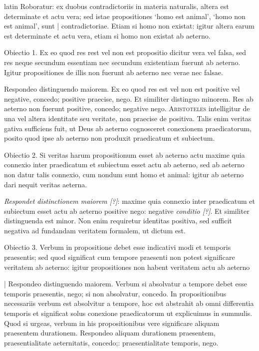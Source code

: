 \begin{otherlanguage*}{latin}
\pstart
  Roboratur: ex duobus contradictoriis in materia naturalis, altera est determinate et actu vera; sed istae propositiones `homo est animal', `homo non est animal', sunt \textnormal{|}   contradictoriae. Etiam si homo non existat: igitur altera earum est determinate et actu vera, etiam si homo non existat ab aeterno. 
\pend

\pstart
  Obiectio 1. Ex eo quod res rest vel non est propositio dicitur vera vel falsa, sed res neque secundum essentiam nec secundum existentiam fuerunt ab aeterno. Igitur propositiones de illis non fuerunt ab aeterno nec verae nec falsae. 
\pend

\pstart
  Respondeo distinguendo maiorem. Ex eo quod res est vel non est positive vel negative, concedo; positive praecise, nego. Et similiter distinguo minorem. Res ab aeterno non fuerunt positive, concedo; negative nego. \textsc{Aristoteles} intelligitur de una vel altera identitate seu veritate, non praecise de positiva. Talis enim veritas gativa sufficiens fuit, ut Deus ab aeterno cognosceret conexionem praedicatorum, posito quod ipse ab aeterno non produxit praedicatum et subiectum. 
\pend

\pstart
  Obiectio 2. Si veritas harum propositionum esset ab aeterno actu maxime quia connexio inter praedicatum et subiectum esset actu ab aeterno, sed ab aeterno non datur talis connexio, cum nondum sunt homo et animal: igitur ab aeterno dari nequit veritas aeterna. 
\pend

\pstart
  \emph{Respondet distinctionem maiorem [?]}: maxime quia connexio inter praedicatum et subiectum esset actu ab aeterno positive nego: negative \emph{conditio [?]}. Et similiter distinguenda est minor. Non enim requiretur identitas positiva, sed sufficit negativa ad fundandam veritatem formalem, ut dictum est. 
\pend

\pstart
  Obiectio 3. Verbum in propositione debet esse indicativi modi et temporis praesentis; sed quod significat cum tempore praesenti non potest significare veritatem ab aeterno: igitur propositiones non habent veritatem actu ab aeterno 
\pend

\pstart
  \textnormal{|} Respondeo distinguendo maiorem. Verbum si absolvatur a tempore debet esse temporis praesentis, nego; si non absolvatur, concedo. In propositionibus necessariis verbum est absolvitur a tempore, hoc est abstrahit ab omni differentia temporis et significat solus conexione praedicatorum ut explicuimus in summulis. Quod si urgeas, verbum in his propositionibus vere significare aliquam praesentem durationem. Respondeo aliquam durationem praesentem, praesentialitate aeternitatis, concedo;: praesentialitate temporis, nego. 
\pend


\end{otherlanguage*}
